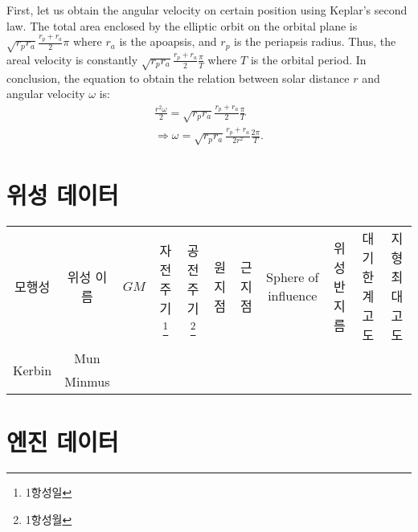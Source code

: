 First, let us obtain the angular velocity on certain position using Keplar's second law.
The total area enclosed by the elliptic orbit on the orbital plane is $\sqrt{r_p r_a}\frac{r_p+r_a}{2}\pi$ where $r_a$ is the apoapsis, and $r_p$ is the periapsis radius. Thus, the areal velocity is constantly $\sqrt{r_p r_a}\frac{r_p+r_a}{2}\frac{\pi}{T}$ where $T$ is the orbital period. In conclusion, the equation to obtain the relation between solar distance $r$ and angular velocity $\omega$ is:
\begin{align}
\frac{r^2 \omega}{2} = \sqrt{r_p r_a}\frac{r_p+r_a}{2}\frac{\pi}{T}
\\\nonumber\Rightarrow \omega = \sqrt{r_p r_a}\frac{r_p+r_a}{2r^2}\frac{2\pi}{T}.
\end{align}



\section{위성 데이터}

\begin{tabular}{|c|c|c|c|c|c|c|c|c|c|c|}
모행성&위성 이름& $GM$& 자전주기\footnote{1항성일}& 공전주기\footnote{1항성월}& 원지점&근지점&Sphere of influence&위성 반지름& 대기한계고도 & 지형 최대고도
\\
\multirow{2}{*}{Kerbin}& Mun
\\&Minmus
\end{tabular}
\section{엔진 데이터}

